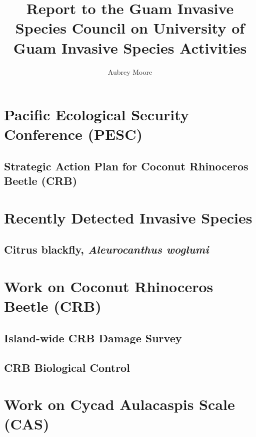 \documentclass[]{scrartcl}
\title{Report to the Guam Invasive Species Council on University of Guam Invasive Species Activities}
\author{Aubrey Moore}
\begin{document}
\maketitle

\section{Pacific Ecological Security Conference (PESC)}

\parencite{anonymousFirstPacificEcological2022}

\parencite{mooreOverviewInvasiveSpecies2022-10-06}

\subsection{Strategic Action Plan for Coconut Rhinoceros Beetle (CRB)}

\cite{conferenceStrategicActionPlan2022}

\section{Recently Detected Invasive Species}

\subsection{Citrus blackfly, \textit{Aleurocanthus woglumi}}

\cite{moore2023}

\section{Work on Coconut Rhinoceros Beetle (CRB)}

\subsection{Island-wide CRB Damage Survey}

\subsection{CRB Biological Control}

\section{Work on Cycad Aulacaspis Scale (CAS)}

\newpage
\printbibliography
\end{document}
